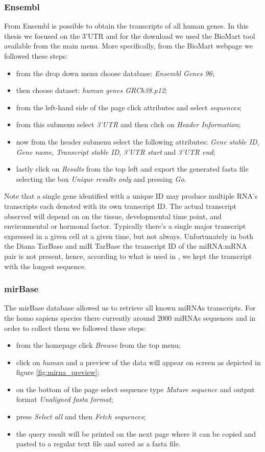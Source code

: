 \subsubsection{Ensembl}
From Ensembl\cite{ensembl} is possible to obtain the transcripts of all human genes. In this thesis we focused on the 3'UTR and for the download we used the BioMart tool available from the main menu. More specifically, from the BioMart webpage we followed these steps:
\begin{itemize}
	\item from the drop down menu choose database: \emph{Ensembl Genes 96};
	\item then choose dataset: \emph{human genes GRCh38.p12};
	\item from the left-hand side of the page click attributes and select \emph{sequences};
	\item from this submenu select \emph{3'UTR} and then click on \emph{Header Information};
	\item now from the header submenu select the following attributes: \emph{Gene stable ID}, \emph{Gene name}, \emph{Transcript stable ID}, \emph{3'UTR start} and \emph{3'UTR end};
	\item lastly click on \emph{Results} from the top left and export the generated fasta file selecting the box \emph{Unique results only} and pressing \emph{Go}.
\end{itemize}
Note that a single gene identified with a unique ID may produce multiple RNA's transcripts each denoted with its own transcript ID. The actual transcript observed will depend on on the tissue, developmental time point, and environmental or hormonal factor. Typically there's a single major transcript expressed in a given cell at a given time, but not always. Unfortunately in both the Diana TarBase and miR TarBase the transcript ID of the miRNA:mRNA pair is not present, hence, according to what is used in \cite{deep_mirtar}, we kept the transcript with the longest sequence.  

\subsubsection{mirBase}
The mirBase database allowed us to retrieve all known miRNAs transcripts. For the homo sapiens species there currently around 2000 miRNAs sequences and in order to collect them we followed these steps:
\begin{itemize}
	\item from the homepage click \emph{Browse} from the top menu;
	\item click on \emph{human} and a preview of the data will appear on screen as depicted in figure \ref{fig:mirna_preview};
	\item on the bottom of the page select sequence type \emph{Mature sequence} and output format \emph{Unaligned fasta format};
	\item press \emph{Select all} and then \emph{Fetch sequences}; 
	\item the query result will be printed on the next page where it can be copied and pasted to a regular text file and saved as a fasta file.
\end{itemize}
 
